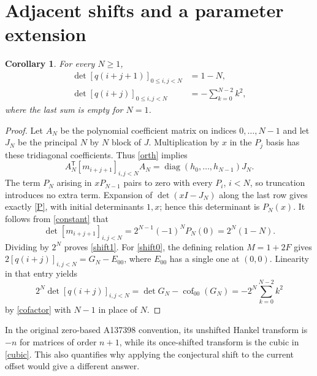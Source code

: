 \documentclass[11pt]{article}
\newtheorem{corollary}[theorem]{Corollary}
\begin{document}
\section{Adjacent shifts and a parameter extension}
\begin{corollary}\label{adjacent}
For every $N\geq1$,
\begin{align}
\det[q(i+j+1)]_{0\leq i,j<N}&=1-N,\label{shift1}\\
\det[q(i+j)]_{0\leq i,j<N}&=-\sum_{k=0}^{N-2}k^2,\label{shift0}
\end{align}
where the last sum is empty for $N=1$.
\end{corollary}
\begin{proof}
Let $A_N$ be the polynomial coefficient matrix on indices $0,\ldots,N-1$
and let $J_N$ be the principal $N$ by $N$ block of $J$.
Multiplication by $x$ in the $P_j$ basis has these tridiagonal
coefficients. Thus \eqref{orth} implies
\[
A_N^{\mathsf T}[m_{i+j+1}]_{i,j<N}A_N
 =\operatorname{diag}(h_0,\ldots,h_{N-1})J_N.
\]
The term $P_N$ arising in $xP_{N-1}$ pairs to zero with every
$P_i$, $i<N$, so truncation introduces no extra term.
Expansion of $\det(xI-J_N)$ along the last row gives exactly
\eqref{P}, with initial determinants $1,x$; hence this determinant
is $P_N(x)$. It follows from \eqref{constant} that
\[
\det[m_{i+j+1}]_{i,j<N}
 =2^{N-1}(-1)^NP_N(0)=2^N(1-N).
\]
Dividing by $2^N$ proves \eqref{shift1}.
For \eqref{shift0}, the defining relation $M=1+2F$ gives
$2[q(i+j)]_{i,j<N}=G_N-E_{00}$, where $E_{00}$ has a single
one at $(0,0)$. Linearity in that entry yields
\[
2^N\det[q(i+j)]_{i,j<N}
 =\det G_N-\operatorname{cof}_{00}(G_N)
 =-2^N\sum_{k=0}^{N-2}k^2
\]
by \eqref{cofactor} with $N-1$ in place of $N$.
\end{proof}

\noindent In the original zero-based A137398 convention, its unshifted
Hankel transform is $-n$ for matrices of order $n+1$, while its
once-shifted transform is the cubic in \eqref{cubic}. This also
quantifies why applying the conjectural shift to the current offset
would give a different answer.
\end{document}
